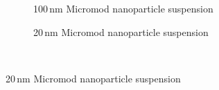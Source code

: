 \begin{figure}[H]
            \begin{subfigure}{0.49\textwidth}
                  \flushleft
                  \caption{100\,nm Micromod nanoparticle suspension}\label{subfig:micromod_100nm_peak}
          \end{subfigure}\hfill
        \begin{subfigure}{0.49\textwidth}
                \flushright
                \caption{20\,nm Micromod nanoparticle suspension}\label{subfig:micromod_20nm_peak}
        \end{subfigure}
        \\

\end{figure}
